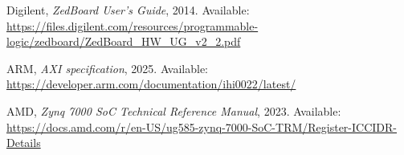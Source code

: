 \documentclass[conference]{IEEEtran}
\begin{document}

\begin{thebibliography}{1}
Digilent,
\textit{ZedBoard User's Guide},
2014.
Available: \url{https://files.digilent.com/resources/programmable-logic/zedboard/ZedBoard_HW_UG_v2_2.pdf}

ARM,
\textit{AXI specification},
2025.
Available: \url{https://developer.arm.com/documentation/ihi0022/latest/}

AMD,
\textit{Zynq 7000 SoC Technical Reference Manual},
2023.
Available: \url{https://docs.amd.com/r/en-US/ug585-zynq-7000-SoC-TRM/Register-ICCIDR-Details}

\end{thebibliography}
\end{document}
